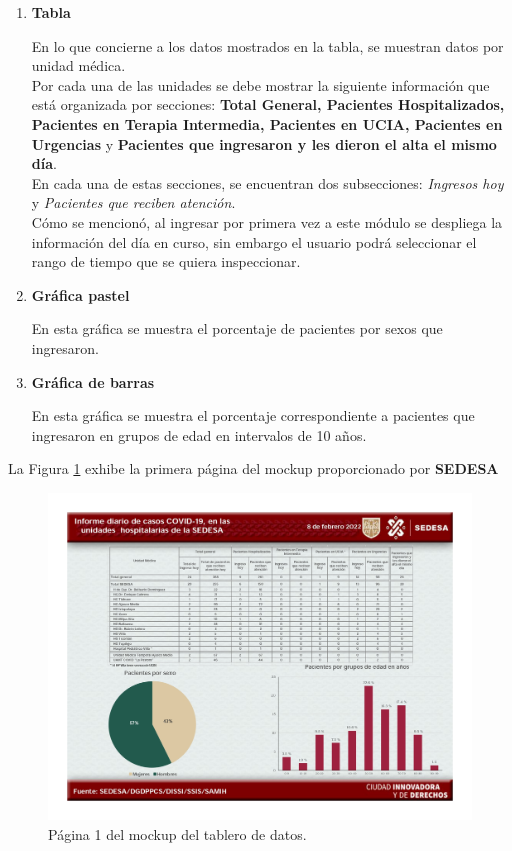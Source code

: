 \begin{enumerate}
    \item \textbf{Tabla}
    
    En lo que concierne a los datos mostrados en la tabla, se muestran datos por unidad médica. \\
    Por cada una de las unidades se debe mostrar la siguiente información que está organizada por secciones: \textbf{Total General, Pacientes Hospitalizados, Pacientes en Terapia Intermedia, Pacientes en UCIA, Pacientes en Urgencias} y  \textbf{Pacientes que ingresaron y les dieron el alta el mismo día}.\\
    En cada una de estas secciones, se encuentran dos subsecciones: \textit{Ingresos hoy} y \textit{Pacientes que reciben atención}.\\

    Cómo se mencionó, al ingresar por primera vez a este módulo se despliega la información del día en curso, sin embargo el usuario podrá seleccionar el rango de tiempo que se quiera inspeccionar.
     
    \item \textbf{Gráfica pastel}

    En esta gráfica se muestra el porcentaje de pacientes por sexos que ingresaron.
    
    \item \textbf{Gráfica de barras}

    En esta gráfica se muestra el porcentaje correspondiente a pacientes que ingresaron en grupos de edad en intervalos de 10 años.
\end{enumerate}

La Figura \ref{fig:mock_pag1} exhibe la primera página del mockup proporcionado por \textbf{SEDESA}

\begin{figure}[H]
        \centering
        \includegraphics[width=\textwidth]{images/mockup_1.jpg}
        \caption{Página 1 del mockup del tablero de datos.} \label{fig:mock_pag1}
\end{figure}


